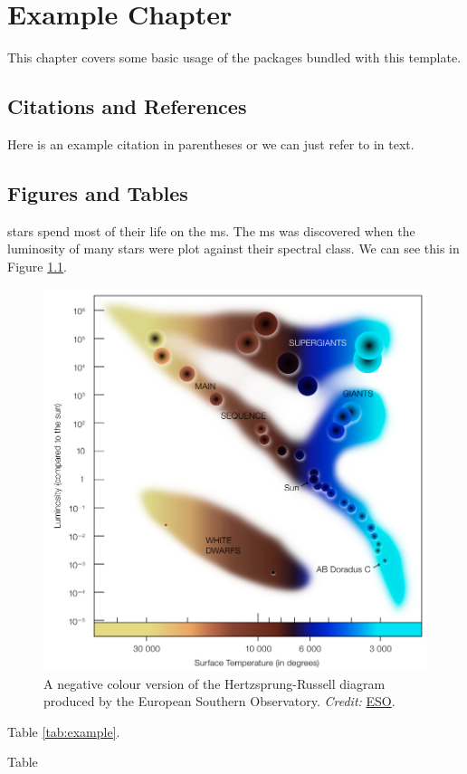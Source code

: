 \chapter{Example Chapter}

This chapter covers some basic usage of the packages bundled with this template.

\section{Citations and References}

Here is an example citation in parentheses \citep{einstein} or we can just refer to \citet{dirac} in text.

\section{Figures and Tables}

\Glspl{star} spend most of their life on the \acrfull{ms}. The \acrshort{ms} was discovered when the \gls{luminosity} of many stars were plot against their spectral class. We can see this in Figure \ref{fig:example}. 

\begin{figure}[t]
  \centering
  \includegraphics{figures/example.pdf}
  \caption[Short version of caption]{A negative colour version of the Hertzsprung-Russell diagram produced by the European Southern Observatory. \emph{Credit:} \href{https://www.eso.org/public/images/eso0728c/}{ESO}.}
  \label{fig:example}
\end{figure}

Table \ref{tab:example}.

\begin{table}
  \centering
  \caption[Short version of caption]{Table}
  \label{tab:example}
  
\end{table}

\lipsum[17-18]
